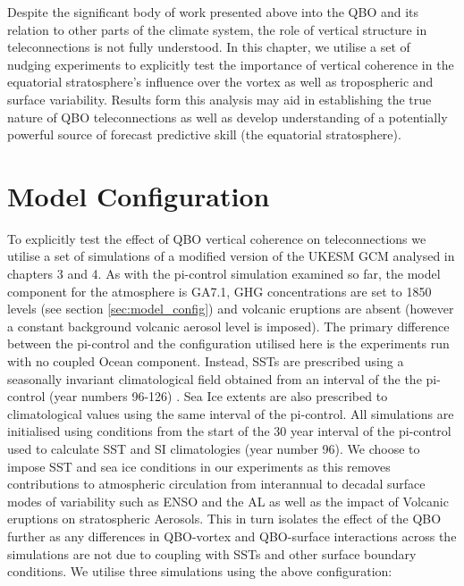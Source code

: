 Despite the significant body of work presented above into the QBO and its relation to other parts of the climate system, the role of vertical structure in teleconnections is not fully understood. In this chapter, we utilise a set of nudging experiments to explicitly test the importance of vertical coherence in the equatorial stratosphere's influence over the vortex as well as tropospheric and surface variability. Results form this analysis may aid in establishing the true nature of QBO teleconnections as well as develop understanding of a potentially powerful source of forecast predictive skill (the equatorial stratosphere).

\section{Model Configuration}

To explicitly test the effect of QBO vertical coherence on teleconnections we utilise a set of simulations of a modified version of the UKESM GCM analysed in chapters 3 and 4. As with the pi-control simulation examined so far, the model component for the atmosphere is GA7.1, GHG concentrations are set to 1850 levels (see section \ref{sec:model_config}) and volcanic eruptions are absent (however a constant background volcanic aerosol level is imposed). The primary difference between the pi-control and the configuration utilised here is the experiments run with no coupled Ocean component. Instead, SSTs are prescribed using a seasonally invariant climatological field obtained from an interval of the the pi-control (year numbers 96-126) \cite{oconnorAssessment2021b}. Sea Ice extents are also prescribed to climatological values using the same interval of the pi-control. All simulations are initialised using conditions from the start of the 30 year interval of the pi-control used to calculate SST and SI climatologies (year number 96). We choose to impose SST and sea ice conditions in our experiments as this removes contributions to atmospheric circulation from interannual to decadal surface modes of variability such as ENSO and the AL as well as the impact of Volcanic eruptions on stratospheric Aerosols. This in turn isolates the effect of the QBO further as any differences in QBO-vortex and QBO-surface interactions across the simulations are not due to coupling with SSTs and other surface boundary conditions. We utilise three simulations using the above configuration:

